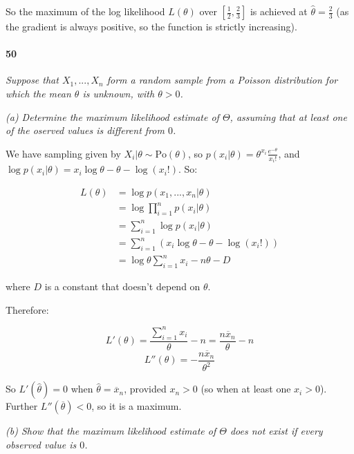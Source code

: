             So the maximum of the log likelihood $L(\theta)$ over
            $\left[\frac{1}{2}, \frac{2}{3}\right]$ is achieved at $\widehat
            \theta = \frac{2}{3}$ (as the gradient is always positive, so
            the function is strictly increasing).

        \paragraph{50}
        \textit{Suppose that $X_1, ..., X_n$ form a random sample from a
        Poisson distribution for which the mean $\theta$ is unknown, with
        $\theta > 0$.}

        \textit{(a) Determine the maximum likelihood estimate of $\Theta$,
        assuming that at least one of the oserved values is different from
        $0$.}

            We have sampling given by $X_i | \theta \sim \text{Po}(\theta)$,
            so $p(x_i | \theta) = \theta^{x_i} \frac{e^{-\theta}}{x_i!}$,
            and $\log{p}(x_i | \theta) = x_i\log{\theta}- \theta -
            \log(x_i!)$. So:

            \begin{align*}
                L(\theta) & = \log p(x_1, ..., x_n | \theta) \\
                & = \log\prod_{i=1}^n p(x_i | \theta) \\
                & = \sum_{i=1}^n \log p(x_i | \theta) \\
                & = \sum_{i=1}^n (x_i\log\theta - \theta - \log(x_i!)) \\
                & = \log\theta \sum_{i=1}^n x_i - n\theta - D
            \end{align*}

            where $D$ is a constant that doesn't depend on $\theta$.

            Therefore:

            \[
                L'(\theta) = \frac{\sum\limits_{i=1}^n x_i}{\theta} - n =
                \frac{n\overline x_n}{\theta} - n
            \]
            \[
                L''(\theta) = -\frac{n\overline x_n}{\theta^2}
            \]

            So $L'(\widehat \theta) = 0$ when $\widehat \theta = \overline
            x_n$, provided $x_n > 0$ (so when at least one $x_i > 0$).
            Further $L''(\overline \theta) < 0$, so it is a maximum.

        \textit{(b) Show that the maximum likelihood estimate of $\Theta$
        does not exist if every observed value is $0$.}


